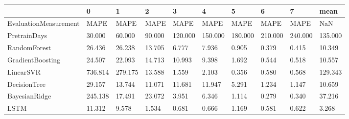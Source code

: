 \begin{tabular}{llllllllll}
\toprule
{} &       0 &       1 &      2 &       3 &       4 &       5 &       6 &       7 &    mean \\
\midrule
EvaluationMeasurement &    MAPE &    MAPE &   MAPE &    MAPE &    MAPE &    MAPE &    MAPE &    MAPE &     NaN \\
PretrainDays          &  30.000 &  60.000 & 90.000 & 120.000 & 150.000 & 180.000 & 210.000 & 240.000 & 135.000 \\
RandomForest          &  26.436 &  26.238 & 13.705 &   6.777 &   7.936 &   0.905 &   0.379 &   0.415 &  10.349 \\
GradientBoosting      &  24.507 &  22.093 & 14.713 &  10.993 &   9.398 &   1.692 &   0.544 &   0.518 &  10.557 \\
LinearSVR             & 736.814 & 279.175 & 13.588 &   1.559 &   2.103 &   0.356 &   0.580 &   0.568 & 129.343 \\
DecisionTree          &  29.157 &  13.744 & 11.071 &  11.681 &  11.947 &   5.291 &   1.234 &   1.147 &  10.659 \\
BayesianRidge         & 245.138 &  17.491 & 23.072 &   3.951 &   6.346 &   1.114 &   0.279 &   0.340 &  37.216 \\
LSTM                  &  11.312 &   9.578 &  1.534 &   0.681 &   0.666 &   1.169 &   0.581 &   0.622 &   3.268 \\
\bottomrule
\end{tabular}
